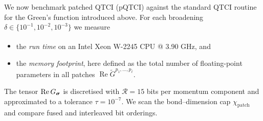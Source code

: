 We now benchmark patched QTCI (pQTCI) against the standard QTCI routine for
the Green’s function introduced above.  For each broadening
\(\delta\in\{10^{-1},10^{-2},10^{-3}\}\) we measure

\begin{itemize}
  \item the \emph{run time} on an Intel\textsuperscript{\textregistered}
        Xeon\textsuperscript{\textregistered} W-2245 CPU @ 3.90 GHz, and
  \item the \emph{memory footprint}, here defined as the total number of
        floating-point parameters in all patches
        \(\operatorname{Re}\widetilde{G}^{p_{1},\dots,p_{\bar\ell}}\).
\end{itemize}

The tensor \(\operatorname{Re}G_{\boldsymbol{\sigma}}\) is discretised with
\(\mathcal R=15\) bits per momentum component and approximated to a tolerance
\(\tau=10^{-7}\).  We scan the bond–dimension cap
\(\chi_{\text{patch}}\) and compare fused and interleaved bit orderings.

